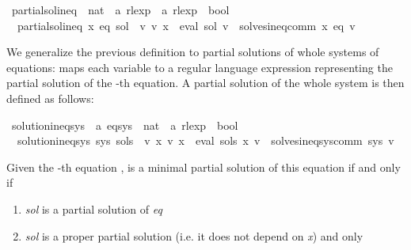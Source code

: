 \begin{isabellebody}
\ partial{\isacharunderscore}{\kern0pt}sol{\isacharunderscore}{\kern0pt}ineq\ {\isacharcolon}{\kern0pt}{\isacharcolon}{\kern0pt}\ {\isachardoublequoteopen}nat\ {\isasymRightarrow}\ {\isacharprime}{\kern0pt}a\ rlexp\ {\isasymRightarrow}\ {\isacharprime}{\kern0pt}a\ rlexp\ {\isasymRightarrow}\ bool{\isachardoublequoteclose}\ \isanewline
\ \ {\isachardoublequoteopen}partial{\isacharunderscore}{\kern0pt}sol{\isacharunderscore}{\kern0pt}ineq\ x\ eq\ sol\ {\isasymequiv}\ {\isasymforall}v{\isachardot}{\kern0pt}\ v\ x\ {\isacharequal}{\kern0pt}\ eval\ sol\ v\ {\isasymlongrightarrow}\ solves{\isacharunderscore}{\kern0pt}ineq{\isacharunderscore}{\kern0pt}comm\ x\ eq\ v{\isachardoublequoteclose}%
\begin{isamarkuptext}%
We generalize the previous definition to partial solutions of whole systems of equations:
 maps each variable  to a regular language expression representing the partial solution
of the -th equation. A partial solution of the whole system is then defined as follows:%
\end{isamarkuptext}\isamarkuptrue%
\isamarkupfalse%
\ solution{\isacharunderscore}{\kern0pt}ineq{\isacharunderscore}{\kern0pt}sys\ {\isacharcolon}{\kern0pt}{\isacharcolon}{\kern0pt}\ {\isachardoublequoteopen}{\isacharprime}{\kern0pt}a\ eq{\isacharunderscore}{\kern0pt}sys\ {\isasymRightarrow}\ {\isacharparenleft}{\kern0pt}nat\ {\isasymRightarrow}\ {\isacharprime}{\kern0pt}a\ rlexp{\isacharparenright}{\kern0pt}\ {\isasymRightarrow}\ bool{\isachardoublequoteclose}\ \isanewline
\ \ {\isachardoublequoteopen}solution{\isacharunderscore}{\kern0pt}ineq{\isacharunderscore}{\kern0pt}sys\ sys\ sols\ {\isasymequiv}\ {\isasymforall}v{\isachardot}{\kern0pt}\ {\isacharparenleft}{\kern0pt}{\isasymforall}x{\isachardot}{\kern0pt}\ v\ x\ {\isacharequal}{\kern0pt}\ eval\ {\isacharparenleft}{\kern0pt}sols\ x{\isacharparenright}{\kern0pt}\ v{\isacharparenright}{\kern0pt}\ {\isasymlongrightarrow}\ solves{\isacharunderscore}{\kern0pt}ineq{\isacharunderscore}{\kern0pt}sys{\isacharunderscore}{\kern0pt}comm\ sys\ v{\isachardoublequoteclose}%
\begin{isamarkuptext}%
Given the -th equation ,  is a minimal partial solution of this equation if and
only if
\begin{enumerate}
\item \textit{sol} is a partial solution of \textit{eq}
\item \textit{sol} is a proper partial solution (i.e. it does not depend on \textit{x}) and only

\end{enumerate}
\end{isamarkuptext}
\end{isabellebody}
